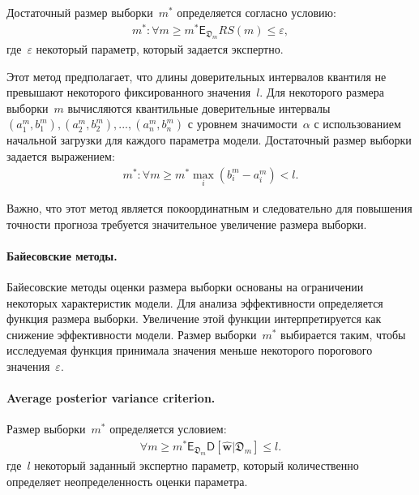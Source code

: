 Достаточный размер выборки~$m^*$ определяется согласно условию:
\[
\label{eq:hb:7}
\begin{aligned}
	m^*: \forall m \geq m^* \mathsf{E}_{\mathfrak{D}_{m}}RS(m) \leq \varepsilon,
\end{aligned}
\]
где~$\varepsilon$ некоторый параметр, который задается экспертно.

Этот метод предполагает, что длины доверительных интервалов квантиля не превышают некоторого фиксированного значения~$l$. Для некоторого размера выборки~$m$ вычисляются квантильные доверительные интервалы~$\left (a^m_1, b^m_1\right), \left(a^m_2, b^m_2 \right), ..., \left(a^m_n, b^m_n \right)$ с уровнем значимости~$\alpha$ с использованием начальной загрузки для каждого параметра модели. Достаточный размер выборки задается выражением:
\[
\label{eq:hb:8}
\begin{aligned}
	m^*: \forall m\geq m^* \max_i\left(b^m_i - a^m_i\right) < l.
\end{aligned}
\]
    
Важно, что этот метод является покоординатным и следовательно для повышения точности прогноза требуется значительное увеличение размера выборки.
    
\paragraph{Байесовские методы.}
Байесовские методы оценки размера выборки основаны на ограничении некоторых характеристик модели. Для анализа эффективности определяется функция размера выборки. Увеличение этой функции интерпретируется как снижение эффективности модели. Размер выборки~$m^*$ выбирается таким, чтобы исследуемая функция принимала значения меньше некоторого порогового значения~$\varepsilon$.

\paragraph{Average posterior variance criterion.}
Размер выборки~$m^*$ определяется условием:
\[
\label{eq:bs:1}
\begin{aligned}
	\forall m \geq m^*    \mathsf{E}_{\mathfrak{D}_m}\mathsf{D}\left[\hat{\textbf{w}}|\mathfrak{D}_m\right] \leq l.
\end{aligned}
\]
где~$l$ некоторый заданный экспертно параметр, который количественно определяет неопределенность оценки параметра.

